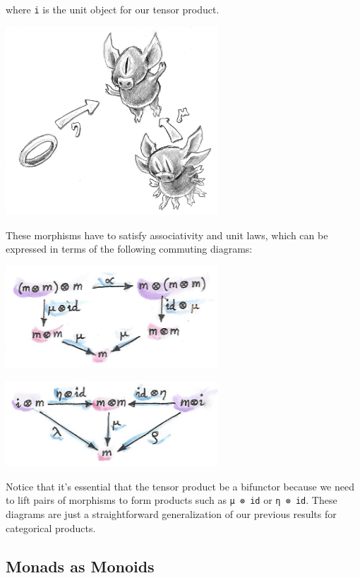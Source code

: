 where \texttt{i} is the unit object for our tensor product.

\includegraphics[width=3.12500in]{images/monoid-1.jpg}

These morphisms have to satisfy associativity and unit laws, which can
be expressed in terms of the following commuting diagrams:

\includegraphics[width=3.12500in]{images/assoctensor.jpg}

\includegraphics[width=3.12500in]{images/unitmon.jpg}

Notice that it's essential that the tensor product be a bifunctor
because we need to lift pairs of morphisms to form products such as
\texttt{μ\ ⊗\ id} or \texttt{η\ ⊗\ id}. These diagrams are just a
straightforward generalization of our previous results for categorical
products.

\subsection{Monads as Monoids}\label{monads-as-monoids}

